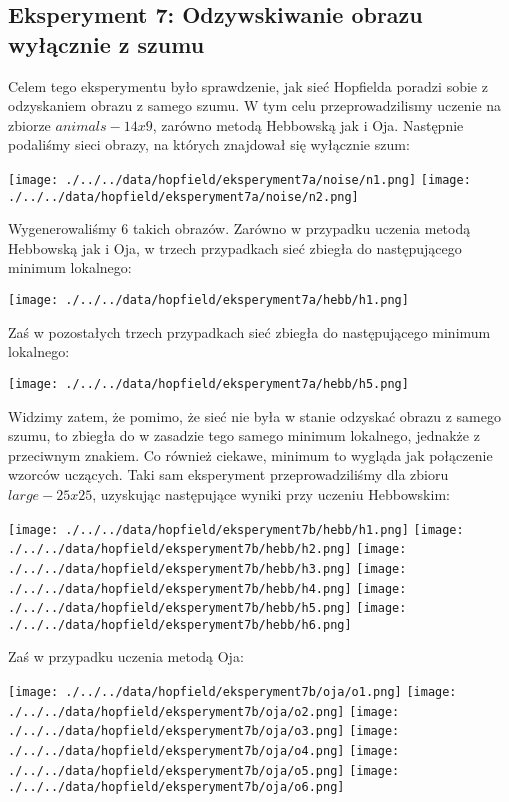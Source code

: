 \documentclass{article}
\begin{document}
\subsection{Eksperyment 7: Odzywskiwanie obrazu wyłącznie z szumu}
Celem tego eksperymentu było sprawdzenie, jak sieć Hopfielda poradzi sobie z odzyskaniem obrazu z samego szumu.
W tym celu przeprowadzilismy uczenie na zbiorze $animals-14x9$, zarówno metodą Hebbowską jak i Oja.
Następnie podaliśmy sieci obrazy, na których znajdował się wyłącznie szum:
\begin{center}
    \texttt{[image: ./../../data/hopfield/eksperyment7a/noise/n1.png]}
    \texttt{[image: ./../../data/hopfield/eksperyment7a/noise/n2.png]}
\end{center}
Wygenerowaliśmy $6$ takich obrazów. Zarówno w przypadku uczenia metodą Hebbowską jak i Oja,
 w trzech przypadkach sieć zbiegła do następującego minimum lokalnego:
\begin{center}
    \texttt{[image: ./../../data/hopfield/eksperyment7a/hebb/h1.png]}
\end{center}
Zaś w pozostałych trzech przypadkach sieć zbiegła do następującego minimum lokalnego:
\begin{center}
    \texttt{[image: ./../../data/hopfield/eksperyment7a/hebb/h5.png]}
\end{center}
Widzimy zatem, że pomimo, że sieć nie była w stanie odzyskać obrazu z samego szumu, to zbiegła do 
w zasadzie tego samego minimum lokalnego, jednakże z przeciwnym znakiem.
Co również ciekawe, minimum to wygląda jak połączenie wzorców uczących.
Taki sam eksperyment przeprowadziliśmy dla zbioru $large-25x25$, uzyskując następujące wyniki przy uczeniu Hebbowskim:
\begin{center}
    \texttt{[image: ./../../data/hopfield/eksperyment7b/hebb/h1.png]}
    \texttt{[image: ./../../data/hopfield/eksperyment7b/hebb/h2.png]}
    \texttt{[image: ./../../data/hopfield/eksperyment7b/hebb/h3.png]}
    \texttt{[image: ./../../data/hopfield/eksperyment7b/hebb/h4.png]}
    \texttt{[image: ./../../data/hopfield/eksperyment7b/hebb/h5.png]}
    \texttt{[image: ./../../data/hopfield/eksperyment7b/hebb/h6.png]}
\end{center}
Zaś w przypadku uczenia metodą Oja:
\begin{center}
    \texttt{[image: ./../../data/hopfield/eksperyment7b/oja/o1.png]}
    \texttt{[image: ./../../data/hopfield/eksperyment7b/oja/o2.png]}
    \texttt{[image: ./../../data/hopfield/eksperyment7b/oja/o3.png]}
    \texttt{[image: ./../../data/hopfield/eksperyment7b/oja/o4.png]}
    \texttt{[image: ./../../data/hopfield/eksperyment7b/oja/o5.png]}
    \texttt{[image: ./../../data/hopfield/eksperyment7b/oja/o6.png]}
\end{center}
\end{document}
